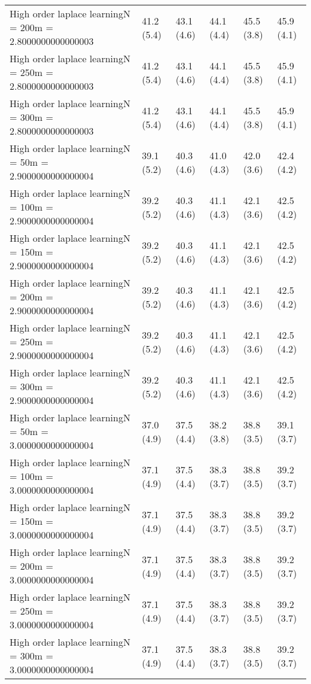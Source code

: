 \documentclass{article}
\begin{document}
\begin{table*}[t!]
\begin{center}
\begin{small}
\begin{sc}
\begin{tabular}{llllll}
High order laplace learningN = 200m = 2.8000000000000003&41.2 (5.4)      &43.1 (4.6)      &44.1 (4.4)      &45.5 (3.8)      &45.9 (4.1)      \\
High order laplace learningN = 250m = 2.8000000000000003&41.2 (5.4)      &43.1 (4.6)      &44.1 (4.4)      &45.5 (3.8)      &45.9 (4.1)      \\
High order laplace learningN = 300m = 2.8000000000000003&41.2 (5.4)      &43.1 (4.6)      &44.1 (4.4)      &45.5 (3.8)      &45.9 (4.1)      \\
High order laplace learningN = 50m = 2.9000000000000004&39.1 (5.2)      &40.3 (4.6)      &41.0 (4.3)      &42.0 (3.6)      &42.4 (4.2)      \\
High order laplace learningN = 100m = 2.9000000000000004&39.2 (5.2)      &40.3 (4.6)      &41.1 (4.3)      &42.1 (3.6)      &42.5 (4.2)      \\
High order laplace learningN = 150m = 2.9000000000000004&39.2 (5.2)      &40.3 (4.6)      &41.1 (4.3)      &42.1 (3.6)      &42.5 (4.2)      \\
High order laplace learningN = 200m = 2.9000000000000004&39.2 (5.2)      &40.3 (4.6)      &41.1 (4.3)      &42.1 (3.6)      &42.5 (4.2)      \\
High order laplace learningN = 250m = 2.9000000000000004&39.2 (5.2)      &40.3 (4.6)      &41.1 (4.3)      &42.1 (3.6)      &42.5 (4.2)      \\
High order laplace learningN = 300m = 2.9000000000000004&39.2 (5.2)      &40.3 (4.6)      &41.1 (4.3)      &42.1 (3.6)      &42.5 (4.2)      \\
High order laplace learningN = 50m = 3.0000000000000004&37.0 (4.9)      &37.5 (4.4)      &38.2 (3.8)      &38.8 (3.5)      &39.1 (3.7)      \\
High order laplace learningN = 100m = 3.0000000000000004&37.1 (4.9)      &37.5 (4.4)      &38.3 (3.7)      &38.8 (3.5)      &39.2 (3.7)      \\
High order laplace learningN = 150m = 3.0000000000000004&37.1 (4.9)      &37.5 (4.4)      &38.3 (3.7)      &38.8 (3.5)      &39.2 (3.7)      \\
High order laplace learningN = 200m = 3.0000000000000004&37.1 (4.9)      &37.5 (4.4)      &38.3 (3.7)      &38.8 (3.5)      &39.2 (3.7)      \\
High order laplace learningN = 250m = 3.0000000000000004&37.1 (4.9)      &37.5 (4.4)      &38.3 (3.7)      &38.8 (3.5)      &39.2 (3.7)      \\
High order laplace learningN = 300m = 3.0000000000000004&37.1 (4.9)      &37.5 (4.4)      &38.3 (3.7)      &38.8 (3.5)      &39.2 (3.7)      \\

\end{tabular}
\end{sc}
\end{small}
\end{center}
\end{table*}
\end{document}
